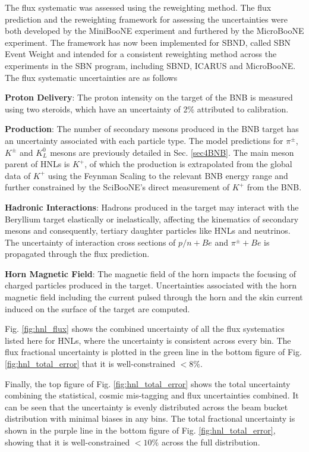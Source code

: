 The flux systematic was assessed using the reweighting method.
The flux prediction and the reweighting framework for assessing the uncertainties were both developed by the MiniBooNE experiment and furthered by the MicroBooNE experiment.
The framework has now been implemented for SBND, called SBN Event Weight \cite{sbnweight_module} and intended for a consistent reweighting method across the experiments in the SBN program, including SBND, ICARUS and MicroBooNE.
The flux systematic uncertainties are as follows
\begin{coloritemize}
	\item \textbf{Proton Delivery}: The proton intensity on the target of the BNB is measured using two steroids, which have an uncertainty of 2\% attributed to calibration.
	\item \textbf{Production}: The number of secondary mesons produced in the BNB target has an uncertainty associated with each particle type. 
		The model predictions for $\pi^\pm$, $K^\pm$ and $K^0_L$ mesons are previously detailed in Sec. \ref{sec4BNB}.
		The main meson parent of HNLs is $K^+$, of which the production is extrapolated from the global data of $K^+$ using the Feynman Scaling to the relevant BNB energy range and further constrained by the SciBooNE's direct measurement of $K^+$ from the BNB.
	\item \textbf{Hadronic Interactions}: Hadrons produced in the target may interact with the Beryllium target elastically or inelastically, affecting the kinematics of secondary mesons and consequently, tertiary daughter particles like HNLs and neutrinos.
		The uncertainty of interaction cross sections of $p/n + Be$ and $\pi^\pm + Be$ is propagated through the flux prediction.
	\item \textbf{Horn Magnetic Field}: The magnetic field of the horn impacts the focusing of charged particles produced in the target.
		Uncertainties associated with the horn magnetic field including the current pulsed through the horn and the skin current induced on the surface of the target are computed.
\end{coloritemize}
Fig. \ref{fig:hnl_flux} shows the combined uncertainty of all the flux systematics listed here for HNLs, where the uncertainty is consistent across every bin.
The flux fractional uncertainty is plotted in the green line in the bottom figure of Fig. \ref{fig:hnl_total_error} that it is well-constrained $< 8\%$.

Finally, the top figure of Fig. \ref{fig:hnl_total_error} shows the total uncertainty combining the statistical, cosmic mis-tagging and flux uncertainties combined.
It can be seen that the uncertainty is evenly distributed across the beam bucket distribution with minimal biases in any bins. 
The total fractional uncertainty is shown in the purple line in the bottom figure of Fig. \ref{fig:hnl_total_error}, showing that it is well-constrained $< 10\%$ across the full distribution.

